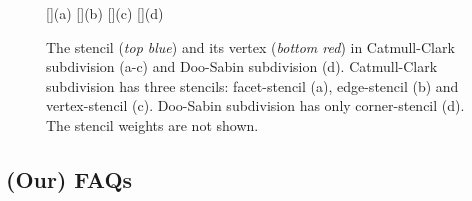 \documentclass[twocolumn]{article}
\begin{document}
\begin{figure}[tb]
  \centering
  []{(a)}
  []{(b)}
  []{(c)}
  []{(d)}
  \caption{The stencil ({\itshape top blue}) and its 
           vertex ({\itshape bottom red}) in 
           Catmull-Clark subdivision (a-c)
           and Doo-Sabin subdivision (d). Catmull-Clark
           subdivision has three stencils: facet-stencil (a), 
           edge-stencil (b) and vertex-stencil (c). 
           Doo-Sabin subdivision has only corner-stencil (d).
           The stencil weights are not shown.}
  \label{fig:RefMap}
\end{figure}

\subsection*{(Our) FAQs}
\end{document}
